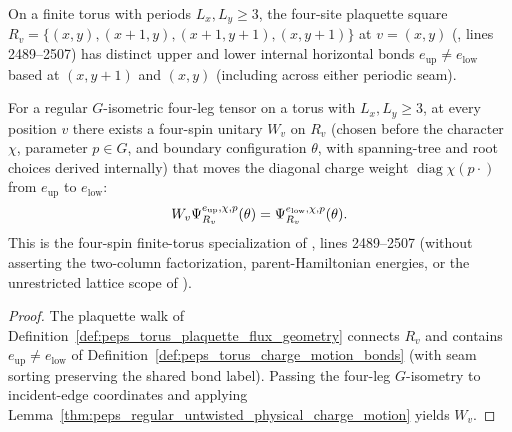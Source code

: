 \begin{definition}
    \label{def:peps_torus_charge_motion_bonds}
    \leanok
    On a finite torus with periods $L_x,L_y\ge 3$, the four-site plaquette square $R_v=\{(x,y),(x+1,y),(x+1,y+1),(x,y+1)\}$ at $v=(x,y)$ (\cite{Schuch2010PEPS}, lines 2489--2507) has distinct upper and lower internal horizontal bonds $e_{\mathrm{up}}\neq e_{\mathrm{low}}$ based at $(x,y+1)$ and $(x,y)$ (including across either periodic seam).
\end{definition}

\begin{lemma}
    \label{thm:peps_torus_physical_charge_motion}
    \leanok
    For a regular $G$-isometric four-leg tensor on a torus with $L_x,L_y\ge 3$, at every position $v$ there exists a four-spin unitary $W_v$ on $R_v$ (chosen before the character $\chi$, parameter $p\in G$, and boundary configuration $\theta$, with spanning-tree and root choices derived internally) that moves the diagonal charge weight $\operatorname{diag}\chi(p\cdot)$ from $e_{\mathrm{up}}$ to $e_{\mathrm{low}}$:
    \begin{align}
        W_v\Psi_{R_v}^{e_{\mathrm{up}},\chi,p}(\theta)=\Psi_{R_v}^{e_{\mathrm{low}},\chi,p}(\theta). \notag
    \end{align}
    This is the four-spin finite-torus specialization of \cite{Schuch2010PEPS}, lines 2489--2507 (without asserting the two-column factorization, parent-Hamiltonian energies, or the unrestricted lattice scope of \cite{gap:rmp_peps_quantum_double_g_isometry}).
\end{lemma}
\begin{proof}\leanok
    The plaquette walk of Definition~\ref{def:peps_torus_plaquette_flux_geometry} connects $R_v$ and contains $e_{\mathrm{up}}\neq e_{\mathrm{low}}$ of Definition~\ref{def:peps_torus_charge_motion_bonds} (with seam sorting preserving the shared bond label).
    Passing the four-leg $G$-isometry to incident-edge coordinates and applying Lemma~\ref{thm:peps_regular_untwisted_physical_charge_motion} yields $W_v$.
\end{proof}
